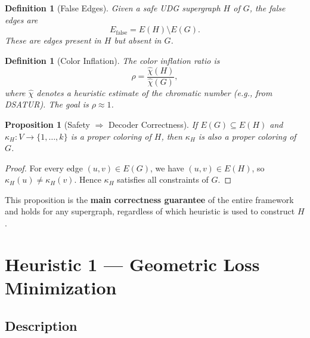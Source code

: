 \documentclass[11pt]{article}
\newtheorem{proposition}[theorem]{Proposition}
\newtheorem{definition}[theorem]{Definition}
\newcommand{\Efalse}{E_{\mathrm{false}}}
\newcommand{\chihat}{\widehat{\chi}}
\begin{document}
\begin{definition}[False Edges]
Given a safe UDG supergraph $H$ of $G$, the \emph{false edges} are
\[
  \Efalse = E(H) \setminus E(G).
\]
These are edges present in $H$ but absent in $G$.
\end{definition}

\begin{definition}[Color Inflation]
The \emph{color inflation ratio} is
\[
  \rho = \frac{\chihat(H)}{\chihat(G)},
\]
where $\chihat$ denotes a heuristic estimate of the chromatic number
(e.g., from DSATUR).  The goal is $\rho \approx 1$.
\end{definition}

\begin{proposition}[Safety $\Rightarrow$ Decoder Correctness]
\label{prop:safety}
If $E(G) \subseteq E(H)$ and $\kappa_H : V \to \{1,\dots,k\}$ is a proper
coloring of $H$, then $\kappa_H$ is also a proper coloring of $G$.
\end{proposition}

\begin{proof}
For every edge $(u,v) \in E(G)$, we have $(u,v) \in E(H)$, so
$\kappa_H(u) \neq \kappa_H(v)$.  Hence $\kappa_H$ satisfies all constraints
of $G$.
\end{proof}

This proposition is the \textbf{main correctness guarantee} of the entire
framework and holds for any supergraph, regardless of which heuristic is used
to construct $H$.

\newpage

\section{Heuristic 1 — Geometric Loss Minimization}

\subsection{Description}
\end{document}
